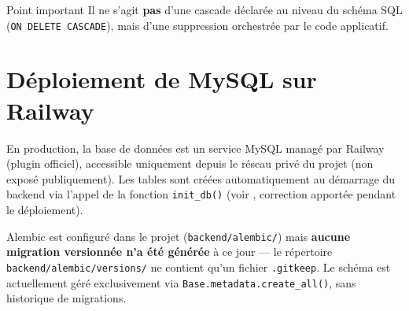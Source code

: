 \begin{noteflag}{Point important}
Il ne s'agit \textbf{pas} d'une cascade d\'eclar\'ee au niveau du sch\'ema SQL (\texttt{ON DELETE CASCADE}), mais d'une suppression orchestr\'ee par le code applicatif.
\end{noteflag}

\section{D\'eploiement de MySQL sur Railway}

En production, la base de donn\'ees est un service MySQL manag\'e par Railway (plugin officiel), accessible uniquement depuis le r\'eseau priv\'e du projet (non expos\'e publiquement). Les tables sont cr\'e\'ees automatiquement au d\'emarrage du backend via l'appel de la fonction \texttt{init\_db()} (voir , correction apport\'ee pendant le d\'eploiement).

Alembic est configur\'e dans le projet (\texttt{backend/alembic/}) mais \textbf{aucune migration versionn\'ee n'a \'et\'e g\'en\'er\'ee} \`a ce jour --- le r\'epertoire \texttt{backend/alembic/versions/} ne contient qu'un fichier \texttt{.gitkeep}. Le sch\'ema est actuellement g\'er\'e exclusivement via \texttt{Base.metadata.create\_all()}, sans historique de migrations.
